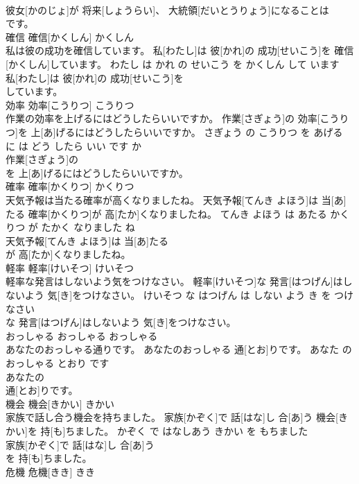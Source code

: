 \documentclass[8pt]{extreport}
\begin{document}
\begin{CJK}{UTF8}{min}
\\	彼女[かのじょ]が 将来[しょうらい]、 大統領[だいとうりょう]になることは
\\	です。			
\\	確信	確信[かくしん]	かくしん	
\\	私は彼の成功を確信しています。	私[わたし]は 彼[かれ]の 成功[せいこう]を 確信[かくしん]しています。	わたし は かれ の せいこう を かくしん して います	
\\	私[わたし]は 彼[かれ]の 成功[せいこう]を
\\	しています。			
\\	効率	効率[こうりつ]	こうりつ	
\\	作業の効率を上げるにはどうしたらいいですか。	作業[さぎょう]の 効率[こうりつ]を 上[あ]げるにはどうしたらいいですか。	さぎょう の こうりつ を あげる に は どう したら いい です か	
\\	作業[さぎょう]の
\\	を 上[あ]げるにはどうしたらいいですか。			
\\	確率	確率[かくりつ]	かくりつ	
\\	天気予報は当たる確率が高くなりましたね。	天気予報[てんき よほう]は 当[あ]たる 確率[かくりつ]が 高[たか]くなりましたね。	てんき よほう は あたる かくりつ が たかく なりました ね	
\\	天気予報[てんき よほう]は 当[あ]たる
\\	が 高[たか]くなりましたね。			
\\	軽率	軽率[けいそつ]	けいそつ	
\\	軽率な発言はしないよう気をつけなさい。	軽率[けいそつ]な 発言[はつげん]はしないよう 気[き]をつけなさい。	けいそつ な はつげん は しない よう き を つけなさい	
\\	な 発言[はつげん]はしないよう 気[き]をつけなさい。			
\\	おっしゃる	おっしゃる	おっしゃる	
\\	あなたのおっしゃる通りです。	あなたのおっしゃる 通[とお]りです。	あなた の おっしゃる とおり です	
\\	あなたの
\\	通[とお]りです。			
\\	機会	機会[きかい]	きかい	
\\	家族で話し合う機会を持ちました。	家族[かぞく]で 話[はな]し 合[あ]う 機会[きかい]を 持[も]ちました。	かぞく で はなしあう きかい を もちました	
\\	家族[かぞく]で 話[はな]し 合[あ]う
\\	を 持[も]ちました。			
\\	危機	危機[きき]	きき	

\end{CJK}
\end{document}
